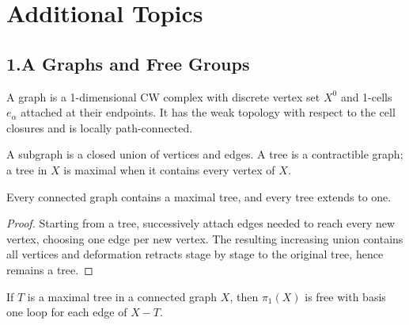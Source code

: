 \section*{Additional Topics}
\subsection{1.A Graphs and Free Groups}
\label{sec:graphs-and-free-groups}

\begin{definition}
\label{def:graph}


A graph is a 1-dimensional CW complex with discrete vertex set $X^0$ and
1-cells $e_\alpha$ attached at their endpoints. It has the weak topology with
respect to the cell closures and is locally path-connected.
\end{definition}

\begin{definition}
\label{def:subgraph-and-tree}



A subgraph is a closed union of vertices and edges. A tree is a contractible
graph; a tree in $X$ is maximal when it contains every vertex of $X$.
\end{definition}

\begin{proposition}
\label{prop:maximal-tree-exists}

Every connected graph contains a maximal tree, and every tree extends to one.
\end{proposition}

\begin{proof}
\sketch Starting from a tree, successively attach edges needed to reach every
new vertex, choosing one edge per new vertex. The resulting increasing union
contains all vertices and deformation retracts stage by stage to the original
tree, hence remains a tree.
\end{proof}

\begin{proposition}
\label{prop:fundamental-group-of-graph-is-free}

If $T$ is a maximal tree in a connected graph $X$, then $\pi_1(X)$ is free
with basis one loop for each edge of $X-T$.
\end{proposition}

